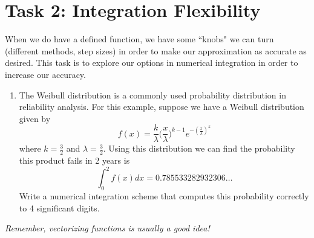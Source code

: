 \documentclass[11pt]{article}
\begin{document}
	\section*{Task 2: Integration Flexibility}
	\noindent When we do have a defined function, we have some ``knobs" we can turn (different methods, step sizes) in order to make our approximation as accurate as desired. This task is to explore our options in numerical integration in order to increase our accuracy.\\
	\begin{enumerate}[label=\alph*)]
		\item The Weibull distribution is a commonly used probability distribution in reliability analysis. For this example, suppose we have a Weibull distribution given by 
		\begin{equation*}
			\displaystyle f(x) = \frac{k}{\lambda}\Big(\frac{x}{\lambda}\Big)^{k-1}e^{-(\frac{x}{\lambda})^k}
		\end{equation*}
		where $k=\frac{3}{2}$ and $\lambda = \frac{3}{2}$. Using this distribution we can find the probability this product fails in 2 years is 
		\begin{equation*}
			\int_0^2f(x)dx = 0.785533282932306\dots
		\end{equation*}
		Write a numerical integration scheme that computes this probability correctly to 4 significant digits.
	\end{enumerate}

	\begin{center}
		\vfill
		\textit{Remember, vectorizing functions is usually a good idea!}
	\end{center}
\end{document}
